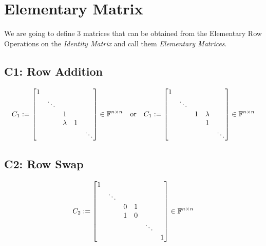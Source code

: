 \chapter{Elementary Matrix}

We are going to define 3 matrices that can be obtained from the Elementary Row
Operations on the \emph{Identity Matrix} and call them \emph{Elementary Matrices}.

\section{C1: Row Addition}

\[
    C_1 :=
    \begin{bmatrix}
        1 &        &         &   &        \\
          & \ddots &         &   &        \\
          &        & 1       &   &        \\
          &        & \lambda & 1 &        \\
          &        &         &   & \ddots \\
    \end{bmatrix}
    \in \mathbb{F}^{n \times n}
    \quad \text{or} \quad
    C_1 :=
    \begin{bmatrix}
        1 &        &   &         &        \\
          & \ddots &   &         &        \\
          &        & 1 & \lambda &        \\
          &        &   & 1       &        \\
          &        &   &         & \ddots \\
    \end{bmatrix}
    \in \mathbb{F}^{n \times n}
\]

\section{C2: Row Swap}

\[
    C_2 :=
    \begin{bmatrix}
        1 &        &   &   &        &   \\
          & \ddots &   &   &        &   \\
          &        & 0 & 1 &        &   \\
          &        & 1 & 0 &        &   \\
          &        &   &   & \ddots &   \\
          &        &   &   &        & 1 \\
    \end{bmatrix}
    \in \mathbb{F}^{n \times n}
\]

